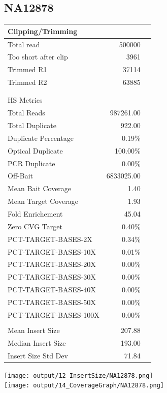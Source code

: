 \documentclass[10pt,twoside,english]{scrartcl}
\begin{document}
 \begin{landscape} 
\subsection{NA12878} 
\begin{minipage}[c][6in]{9.3in} 
\centering 
\begin{minipage}[c][6in]{4in}
\centering
\begin{tabular}{lrl}
\multicolumn{3}{l}{Clipping/Trimming} \\ 

\hline 
Total read              & 500000 \\ 
Too short after clip    & 3961  \\ 
Trimmed R1              & 37114 \\ 
Trimmed R2              & 63885  \\ 
\hline 
\\\\ 
\multicolumn{3}{l}{HS Metrics} \\ 
\hline 
Total Reads             & 987261.00  \\ 
Total Duplicate         & 922.00  \\ 
Duplicate Percentage    & 0.19\%   \\ 
Optical Duplicate       & 100.00\%   \\ 
PCR Duplicate           & 0.00\%   \\ 
Off-Bait                & 6833025.00   \\ 
Mean Bait Coverage      & 1.40   \\ 
Mean Target Coverage    & 1.93   \\ 
Fold Enrichement        & 45.04   \\ 
Zero CVG Target         & 0.40\%  \\ 
PCT-TARGET-BASES-2X     & 0.34\%   \\ 
PCT-TARGET-BASES-10X    & 0.01\%   \\ 
PCT-TARGET-BASES-20X    & 0.00\%   \\ 
PCT-TARGET-BASES-30X    & 0.00\%   \\ 
PCT-TARGET-BASES-40X    & 0.00\%   \\ 
PCT-TARGET-BASES-50X    & 0.00\%   \\ 
PCT-TARGET-BASES-100X   & 0.00\%   \\ 
\hline 
\\ 
\hline 
Mean Insert Size        & 207.88 \\ 
Median Insert Size      & 193.00 \\ 
Insert Size Std Dev     & 71.84 \\ 
\hline 
\end{tabular}
\end{minipage}%
\begin{minipage}[c][6in]{5in}
\centering 
\texttt{[image: output/12\_InsertSize/NA12878.png]}\\ 
\vfill 
\texttt{[image: output/14\_CoverageGraph/NA12878.png]} 
\end{minipage} 
\end{minipage} 
\end{landscape} 

\end{document}
